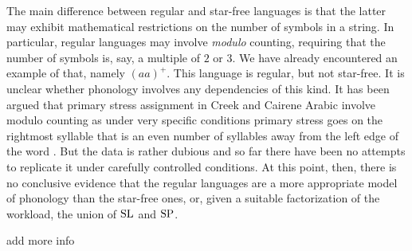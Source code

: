 The main difference between regular and star-free languages is that the latter may exhibit mathematical restrictions on the number of symbols in a string.
In particular, regular languages may involve \emph{modulo} counting, requiring that the number of symbols is, say, a multiple of $2$ or $3$.
We have already encountered an example of that, namely $(aa)^+$.
This language is regular, but not star-free.
It is unclear whether phonology involves any dependencies of this kind.
It has been argued that primary stress assignment in Creek and Cairene Arabic involve modulo counting as under very specific conditions primary stress goes on the rightmost syllable that is an even number of syllables away from the left edge of the word \citep{Graf10PLC33,Graf10thesis}.
But the data is rather dubious and so far there have been no attempts to replicate it under carefully controlled conditions.
At this point, then, there is no conclusive evidence that the regular languages are a more appropriate model of phonology than the star-free ones, or, given a suitable factorization of the workload, the union of $\mathrm{SL}$ and $\mathrm{SP}$.







\begin{literature}
add more info
\end{literature}
